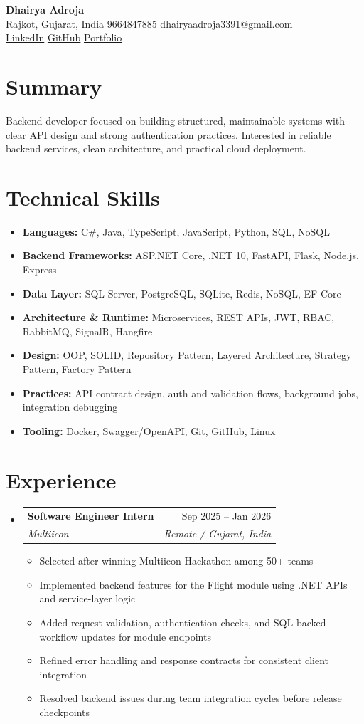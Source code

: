 \documentclass[11pt,a4paper]{article}
\makeatletter
\newcommand{\resumeSubheading}[4]{
  \vspace{-1pt}\item
    \begin{tabular*}{0.97\textwidth}[t]{l@{\extracolsep{\fill}}r}
      \textbf{#1} & #2 \\
      \textit{#3} & \textit{#4} \\
    \end{tabular*}\vspace{-3pt}
}
\newcommand{\resumeItem}[1]{
  \item\small{#1 \vspace{-1pt}}
}
\makeatother
\begin{document}
\begin{center}
    {\huge \textbf{Dhairya Adroja}} \\
    \vspace{8pt}
    \small Rajkot, Gujarat, India \textbar{} 9664847885 \textbar{} dhairyaadroja3391@gmail.com \\
    \small
    \href{https://www.linkedin.com/in/adrojadhairya}{LinkedIn} \textbar{}
    \href{https://www.github.com/Dhairya3391}{GitHub} \textbar{}
    \href{https://dhairya.codes}{Portfolio}
\end{center}

\section{Summary}
\noindent Backend developer focused on building structured, maintainable systems with clear API design and strong authentication practices. Interested in reliable backend services, clean architecture, and practical cloud deployment.

\section{Technical Skills}
\begin{itemize}[leftmargin=*]
  \resumeItem{\textbf{Languages:} C\#, Java, TypeScript, JavaScript, Python, SQL, NoSQL}
  \resumeItem{\textbf{Backend Frameworks:} ASP.NET Core, .NET 10, FastAPI, Flask, Node.js, Express}
  \resumeItem{\textbf{Data Layer:} SQL Server, PostgreSQL, SQLite, Redis, NoSQL, EF Core}
  \resumeItem{\textbf{Architecture \& Runtime:} Microservices, REST APIs, JWT, RBAC, RabbitMQ, SignalR, Hangfire}
  \resumeItem{\textbf{Design:} OOP, SOLID, Repository Pattern, Layered Architecture, Strategy Pattern, Factory Pattern}
  \resumeItem{\textbf{Practices:} API contract design, auth and validation flows, background jobs, integration debugging}
  \resumeItem{\textbf{Tooling:} Docker, Swagger/OpenAPI, Git, GitHub, Linux}
\end{itemize}

\section{Experience}
\begin{itemize}[leftmargin=*]

\resumeSubheading
{Software Engineer Intern}{Sep 2025 -- Jan 2026}
{Multiicon}{Remote / Gujarat, India}
\begin{itemize}[leftmargin=*]
  \resumeItem{Selected after winning Multiicon Hackathon among 50+ teams}
  \resumeItem{Implemented backend features for the Flight module using .NET APIs and service-layer logic}
  \resumeItem{Added request validation, authentication checks, and SQL-backed workflow updates for module endpoints}
  \resumeItem{Refined error handling and response contracts for consistent client integration}
  \resumeItem{Resolved backend issues during team integration cycles before release checkpoints}
\end{itemize}

\end{itemize}
\end{document}
